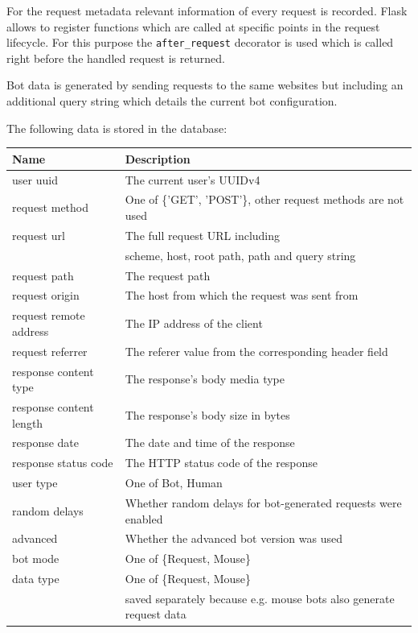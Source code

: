 \documentclass[
    fontsize=12pt,
    headings=small,
    parskip=half,           %
    bibliography=totoc,
    numbers=noenddot,       %
    open=any,               %
    final,                   %
    table
]{scrreprt}
\renewcommand{\arraystretch}{1}
\begin{document}
For the request metadata relevant information of every request is recorded. Flask allows to register functions which are called at specific points in the request lifecycle. For this purpose the \lstinline{after_request} decorator is used which is called right before the handled request is returned.

Bot data is generated by sending requests to the same websites but including an additional query string which details the current bot configuration.

The following data is stored in the database:

\renewcommand{\arraystretch}{1.2}

\begin{table}[H]
\begin{center}
\begin{tabular}{ll}
\toprule
Name & Description \\
\midrule
user uuid & The current user's UUIDv4 \\
request method & One of \{'GET', 'POST'\}, other request methods are not used \\
request url & The full request URL including \\ & scheme, host, root path, path and query string \\
request path & The request path \\
request origin & The host from which the request was sent from \\
request remote address & The IP address of the client \\
request referrer & The referer value from the corresponding header field \\
response content type & The response's body media type \\
response content length & The response's body size in bytes \\
response date & The date and time of the response \\
response status code & The HTTP status code of the response \\
user type & One of {Bot, Human} \\
random delays & Whether random delays for bot-generated requests were enabled \\
advanced & Whether the advanced bot version was used \\
bot mode & One of \{Request, Mouse\} \\
data type & One of \{Request, Mouse\} \\ & saved separately because e.g. mouse bots also generate request data \\
\bottomrule

\end{tabular}
\end{center}
\end{table}
\end{document}
